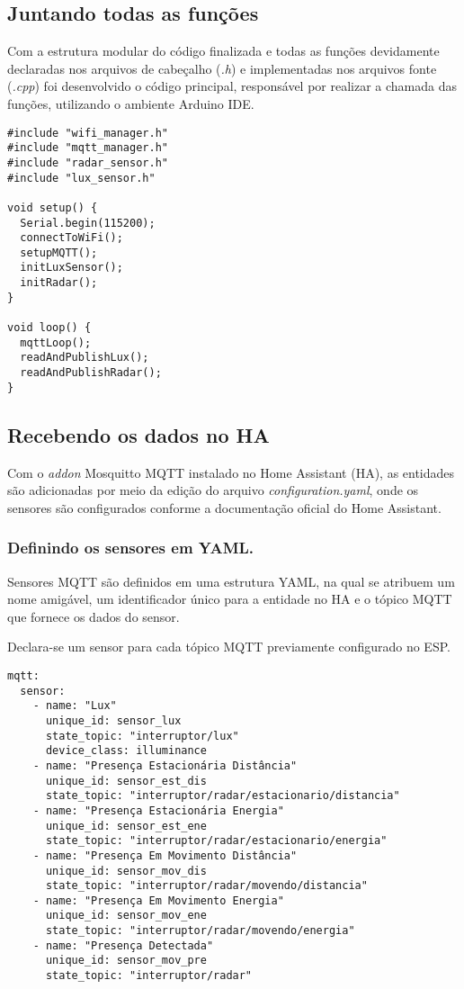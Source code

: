 \documentclass[]{abntex2}
\begin{document}
\subsection{Juntando todas as funções}
Com a estrutura modular do código finalizada e todas as funções devidamente
declaradas nos arquivos de cabeçalho (\textit{.h}) e implementadas nos arquivos
fonte (\textit{.cpp}) foi desenvolvido o código principal, responsável por
realizar a chamada das funções, utilizando o ambiente Arduino IDE.
\begin{verbatim}
#include "wifi_manager.h"
#include "mqtt_manager.h"
#include "radar_sensor.h"
#include "lux_sensor.h"

void setup() {
  Serial.begin(115200);
  connectToWiFi();
  setupMQTT();
  initLuxSensor();
  initRadar();
}

void loop() {
  mqttLoop();
  readAndPublishLux();
  readAndPublishRadar();
}
\end{verbatim}

\subsection{Recebendo os dados no HA}
Com o \textit{addon} Mosquitto MQTT instalado no Home Assistant (HA), as
entidades são adicionadas por meio da edição do arquivo
\textit{configuration.yaml}, onde os sensores são configurados conforme a
documentação oficial do Home Assistant.

 \subsubsection{Definindo os sensores em YAML.}
Sensores MQTT são definidos em uma estrutura YAML, na qual se atribuem um nome
amigável, um identificador único para a entidade no HA e o tópico MQTT que
fornece os dados do sensor.

Declara-se um sensor para cada tópico MQTT previamente configurado no ESP.

\begin{verbatim}
mqtt:
  sensor:
    - name: "Lux"
      unique_id: sensor_lux
      state_topic: "interruptor/lux"
      device_class: illuminance
    - name: "Presença Estacionária Distância"
      unique_id: sensor_est_dis
      state_topic: "interruptor/radar/estacionario/distancia"
    - name: "Presença Estacionária Energia"
      unique_id: sensor_est_ene
      state_topic: "interruptor/radar/estacionario/energia"
    - name: "Presença Em Movimento Distância"
      unique_id: sensor_mov_dis
      state_topic: "interruptor/radar/movendo/distancia"
    - name: "Presença Em Movimento Energia"
      unique_id: sensor_mov_ene
      state_topic: "interruptor/radar/movendo/energia"
    - name: "Presença Detectada"
      unique_id: sensor_mov_pre
      state_topic: "interruptor/radar"
\end{verbatim}
\end{document}
